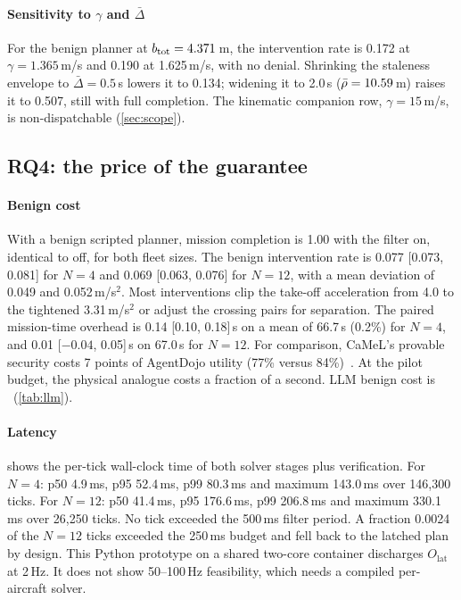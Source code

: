 \paragraph{Sensitivity to $\gamma$ and $\bar\Delta$} For the benign planner at
$b_{\mathrm{tot}}=4.371$\,m, the intervention rate is 0.172 at $\gamma=1.365$\,m/s and
0.190 at 1.625\,m/s, with no denial. Shrinking the staleness envelope to
$\bar\Delta=0.5$\,s lowers it to 0.134; widening it to 2.0\,s
($\bar\rho=10.59$\,m) raises it to 0.507, still with full completion. The
kinematic companion row, $\gamma=15$\,m/s, is non-dispatchable
(\cref{sec:scope}).

\subsection{RQ4: the price of the guarantee}\label{sec:rq4}
\paragraph{Benign cost} With a benign scripted planner, mission completion
is 1.00 with the filter on, identical to off, for both fleet sizes. The
benign intervention rate is 0.077 [0.073, 0.081] for $N=4$ and 0.069 [0.063,
0.076] for $N=12$, with a mean deviation of 0.049 and 0.052\,m/s$^2$. Most
interventions clip the take-off acceleration from 4.0 to the tightened
3.31\,m/s$^2$ or adjust the crossing pairs for separation. The paired
mission-time overhead is 0.14 [0.10, 0.18]\,s on a mean of 66.7\,s (0.2\%) for
$N=4$, and 0.01 [$-0.04$, 0.05]\,s on 67.0\,s for $N=12$. For comparison,
CaMeL's provable security costs 7 points of AgentDojo utility (77\% versus
84\%)~\cite{debenedetti2025camel}. At the pilot budget, the physical
analogue costs a fraction of a second. LLM benign cost is \pending\
(\cref{tab:llm}).

\paragraph{Latency}  shows the per-tick wall-clock time of
both solver stages plus verification. For $N=4$: p50 4.9\,ms, p95 52.4\,ms,
p99 80.3\,ms and maximum 143.0\,ms over 146,300 ticks. For $N=12$: p50
41.4\,ms, p95 176.6\,ms, p99 206.8\,ms and maximum 330.1\,ms over 26,250 ticks.
No tick exceeded the 500\,ms filter period. A fraction 0.0024 of the $N=12$
ticks exceeded the 250\,ms budget and fell back to the latched plan by design.
This Python prototype on a shared two-core container discharges
$O_{\mathrm{lat}}$ at 2\,Hz. It does not show 50--100\,Hz feasibility, which
needs a compiled per-aircraft solver.

